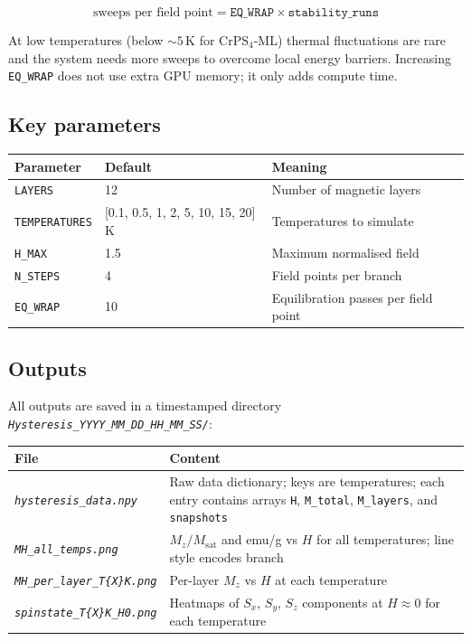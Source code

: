 \documentclass[12pt,a4paper]{article}
\newcommand{\code}[1]{\texttt{#1}}
\newcommand{\file}[1]{\texttt{\textit{#1}}}
\newcommand{\param}[1]{\texttt{#1}}
\begin{document}
\[
\text{sweeps per field point} = \texttt{EQ\_WRAP} \times \texttt{stability\_runs}
\]

At low temperatures (below $\sim 5\,\text{K}$ for CrPS$_4$-ML) thermal
fluctuations are rare and the system needs more sweeps to overcome local energy
barriers. Increasing \param{EQ\_WRAP} does not use extra GPU memory; it only
adds compute time.

\subsection{Key parameters}

\begin{center}
\begin{tabular}{lll}
\toprule
\textbf{Parameter} & \textbf{Default} & \textbf{Meaning} \\
\midrule
\code{LAYERS}       & 12     & Number of magnetic layers \\
\code{TEMPERATURES} & [0.1, 0.5, 1, 2, 5, 10, 15, 20]\,K & Temperatures to simulate \\
\code{H\_MAX}       & 1.5    & Maximum normalised field \\
\code{N\_STEPS}     & 4      & Field points per branch \\
\code{EQ\_WRAP}     & 10     & Equilibration passes per field point \\
\bottomrule
\end{tabular}
\end{center}

\subsection{Outputs}

All outputs are saved in a timestamped directory
\file{Hysteresis\_YYYY\_MM\_DD\_HH\_MM\_SS/}:

\begin{center}
\begin{tabular}{lp{9cm}}
\toprule
\textbf{File} & \textbf{Content} \\
\midrule
\file{hysteresis\_data.npy} & Raw data dictionary; keys are temperatures;
                               each entry contains arrays \code{H}, \code{M\_total},
                               \code{M\_layers}, and \code{snapshots} \\
\file{MH\_all\_temps.png}   & $M_z/M_\text{sat}$ and emu/g vs $H$ for all
                               temperatures; line style encodes branch \\
\file{MH\_per\_layer\_T\{X\}K.png} & Per-layer $M_z$ vs $H$ at each temperature \\
\file{spinstate\_T\{X\}K\_H0.png} & Heatmaps of $S_x$, $S_y$, $S_z$ components
                                     at $H \approx 0$ for each temperature \\
\bottomrule
\end{tabular}
\end{center}
\end{document}
